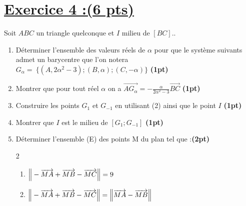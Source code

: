 \documentclass[12pt,a4paper]{article}
\begin{document}
\section*{\underline{Exercice 4 :(6 pts)} }
Soit $ABC$ un triangle quelconque et $I$ milieu de $[BC]$..

\begin{enumerate}
    \item Déterminer l'ensemble des valeurs réels de $\alpha$ pour que le système suivants admet un barycentre que l'on notera $G_\alpha =\ \{(A, 2\alpha^2 - 3) ; (B, \alpha) ; (C, -\alpha)\}$ \hfill \textbf{(1pt)}
    
    \item Montrer que pour tout réel $\alpha$ on a $\overrightarrow{AG_\alpha} = -\frac{\alpha}{2\alpha^2 - 3}\overrightarrow{BC}$ \hfill \textbf{(1pt)}
    
    \item Construire les points $G_1$ et $G_{-1}$ en utilisant (2) ainsi que le point $I$ \hfill \textbf{(1pt)}
    
    \item Montrer que $I$ est le milieu de $[G_1 ; G_{-1}]$ \hfill \textbf{(1pt)}
    
    \item Déterminer l'ensemble (E) des points M du plan tel que :\hfill \textbf{(2pt)}
    \begin{multicols}{2}
\setlength{\columnseprule}{1mm} %
    \begin{enumerate}
        \item $\left\|\rule{0pt}{12pt} -\overrightarrow{MA} + \overrightarrow{MB} - \overrightarrow{MC}\right\| = 9$ 
        \item $\left\|\rule{0pt}{12pt} -\overrightarrow{MA} + \overrightarrow{MB} - \overrightarrow{MC}\right\| = \left\|\rule{0pt}{12pt} \overrightarrow{MA} - \overrightarrow{MB}\right\|$ 
    \end{enumerate}
    \end{multicols} 
\end{enumerate}
\end{document}
